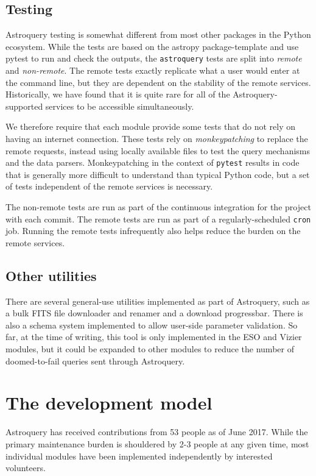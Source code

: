 \documentclass[twocolumn]{aastex61}
\begin{document}
\subsection{Testing}
Astroquery testing is somewhat different from most other packages in the Python
ecosystem.  While the tests are based on the astropy package-template and use
pytest to run and check the outputs, the \texttt{astroquery} tests are split into
\emph{remote} and \emph{non-remote}.  The remote tests exactly replicate what a user
would enter at the command line, but they are dependent on the stability of the
remote services.  Historically, we have found that it is quite rare for all of
the Astroquery-supported services to be accessible simultaneously.

We therefore require that each module provide some tests that do not rely on
having an internet connection.  These tests rely on \emph{monkeypatching} to
replace the remote requests, instead using locally available files to test the
query mechanisms and the data parsers.  Monkeypatching in the context of
\texttt{pytest} results in code that is generally more difficult to understand
than typical Python code, but a set of tests independent of the remote services
is necessary.

The non-remote tests are run as part of the continuous integration for the
project with each commit.  The remote tests are run as part of a
regularly-scheduled \texttt{cron} job.  Running the remote tests infrequently
also helps reduce the burden on the remote services.

\subsection{Other utilities}
There are several general-use utilities implemented as part of Astroquery, such
as a bulk FITS file downloader and renamer and a download progressbar.  There
is also a schema system implemented to allow user-side parameter validation.
So far, at the time of writing, this tool is only implemented in the ESO and
Vizier modules, but it could be expanded to other modules to reduce the number
of doomed-to-fail queries sent through Astroquery.

\section{The development model}
\label{sec:development}
Astroquery has received contributions from 53 people as of June 2017.
While the primary maintenance burden is shouldered by 2-3 people at any given time,
most individual modules have been implemented independently by interested volunteers.
\end{document}
